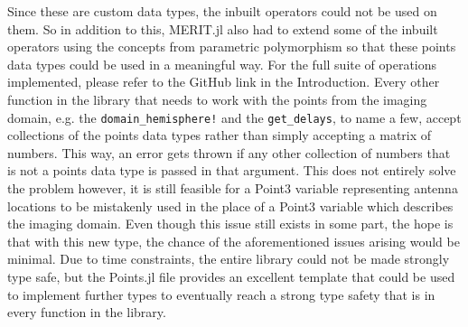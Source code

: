 Since these are custom data types, the inbuilt operators could not be used on them. So in addition to this, MERIT.jl
also had to extend some of the inbuilt operators using the concepts from parametric polymorphism so that these points
data types could be used in a meaningful way. For the full suite of operations implemented, please refer to the GitHub
link in the Introduction. Every other function in the library that needs to work with the points from the imaging domain,
e.g. the \lstinline[language=Julia]{domain_hemisphere!} and the \lstinline[language=Julia]{get_delays}, to name a few,
accept collections of the points data types rather than simply accepting a matrix of numbers. This way, an error gets
thrown if any other collection of numbers that is not a points data type is passed in that argument. This does not
entirely solve the problem however, it is still feasible for a Point3 variable representing antenna locations to be
mistakenly used in the place of a Point3 variable which describes the imaging domain. Even though this issue still
exists in some part, the hope is that with this new type, the chance of the aforementioned issues arising would be
minimal. Due to time constraints, the entire library could not be made strongly type safe, but the Points.jl file
provides an excellent template that could be used to implement further types to eventually reach a strong type safety
that is in every function in the library. %

